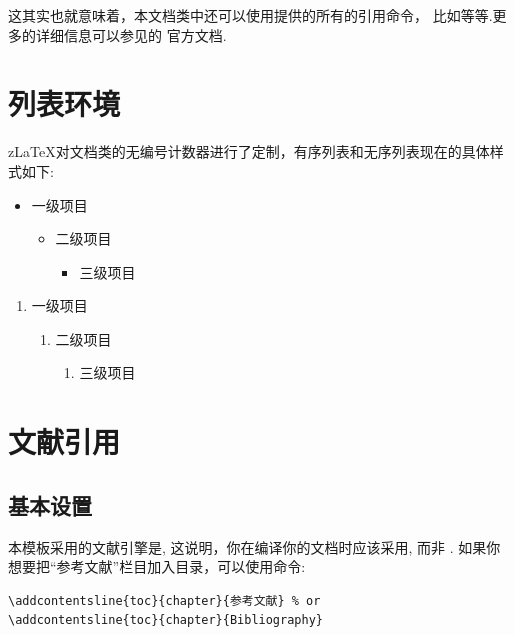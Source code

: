 这其实也就意味着，本文档类中还可以使用提供的所有的引用命令，
比如\cmd{\Cref, \crefrange, \Crefrange}等等.更多的详细信息可以参见的
官方文档.

\section{列表环境}
z\LaTeX{}对文档类的无编号计数器进行了定制，有序列表和无序列表现在的具体样式如下:

\begin{multicols}{2}
    \begin{itemize}
        \item 一级项目
        \begin{itemize}
            \item 二级项目
            \begin{itemize}
                \item 三级项目
            \end{itemize}
        \end{itemize}
    \end{itemize}
    
    \begin{enumerate}
        \item 一级项目
        \begin{enumerate}
            \item 二级项目
            \begin{enumerate}
                \item 三级项目
            \end{enumerate}
        \end{enumerate}
    \end{enumerate}
\end{multicols}


\section{文献引用}
\subsection{基本设置}
本模板采用的文献引擎是, 这说明，你在编译你的文档时应该采用, 而非
. 如果你想要把``参考文献''栏目加入目录，可以使用命令\cite{ahlfors1953complex}:

\begin{verbatim}
\addcontentsline{toc}{chapter}{参考文献} % or
\addcontentsline{toc}{chapter}{Bibliography}
\end{verbatim}

